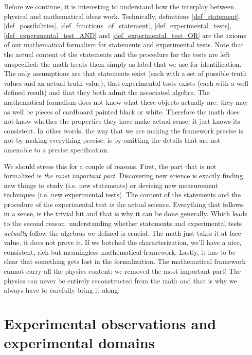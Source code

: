 \documentclass[11pt,letterpaper,fleqn]{memoir} %
\begin{document}
Before we continue, it is interesting to understand how the interplay between physical and mathematical ideas work. Technically, definitions \ref{def_statement}, \ref{def_possibilities}, \ref{def_functions_of_statement}, \ref{def_experimental_tests}, \ref{def_experimental_test_AND} and \ref{def_experimental_test_OR} are the axioms of our mathematical formalism for statements and experimental tests. Note that the actual content of the statements and the procedure for the tests are left unspecified: the math treats them simply as label that we use for identification. The only assumptions are that statements exist (each with a set of possible truth values and an actual truth value), that experimental tests exists (each with a well defined result) and that they both admit the associated algebra. The mathematical formalism does not know what these objects actually are: they may as well be pieces of cardboard painted black or white. Therefore the math does not know whether the properties they have make actual sense: it just knows its consistent. In other words, the way that we are making the framework precise is not by making everything precise: is by omitting the details that are not amenable to a precise specification.

We should stress this for a couple of reasons. First, the part that is not formalized is \emph{the most important part}. Discovering new science is exactly finding new things to study (i.e. new statements) or devising new measurement techniques (i.e. new experimental tests). The content of the statements and the procedure of the experimental test \emph{is} the actual science. Everything that follows, in a sense, is the trivial bit and that is why it can be done generally. Which leads to the second reason: understanding whether statements and experimental tests \emph{actually} follow the algebras we defined is crucial. The math just takes it at face value, it does not prove it. If we botched the characterization, we'll have a nice, consistent, rich but meaningless mathematical framework. Lastly, it has to be clear that something gets lost in the formalization. The mathematical framework cannot carry all the physics content: we removed the most important part! The physics can never be entirely reconstructed from the math and that is why we always have to carefully bring it along.

\section{Experimental observations and experimental domains}
\end{document}
